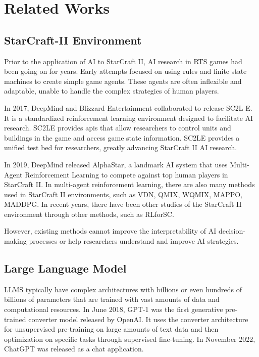 \section{Related Works}
\subsection{StarCraft-II Environment}
Prior to the application of AI to StarCraft II, AI research in RTS games had been going on for years. Early attempts focused on using rules and finite state machines to create simple game agents. These agents are often inflexible and adaptable, unable to handle the complex strategies of human players. 

In 2017, DeepMind and Blizzard Entertainment collaborated to release SC2L
E\cite{SC2LE}. It is a standardized reinforcement learning environment designed to facilitate AI research. SC2LE provides apis that allow researchers to control units and buildings in the game and access game state information. SC2LE provides a unified test bed for researchers, greatly advancing StarCraft II AI research. 

In 2019, DeepMind released AlphaStar, a landmark AI system that uses Multi-Agent Reinforcement Learning to compete against top human players in StarCraft II. In multi-agent reinforcement learning, there are also many methods used in StarCraft II environments, such as VDN\cite{VDN}, QMIX\cite{QMIX}, WQMIX\cite{WQMIX}, MAPPO\cite{MAPPO}, MADDPG\cite{MADDPG}. In recent years, there have been other studies of the StarCraft II environment through other methods, such as RLforSC\cite{RLforSC}.

However, existing methods cannot improve the interpretability of AI decision-making processes or help researchers understand and improve AI strategies.


\subsection{Large Language Model}
LLMS typically have complex architectures with billions or even hundreds of billions of parameters that are trained with vast amounts of data and computational resources. In June 2018, GPT-1 was the first generative pre-trained converter model released by OpenAI. It uses the converter architecture for unsupervised pre-training on large amounts of text data and then optimization on specific tasks through supervised fine-tuning. In November 2022, ChatGPT was released as a chat application. 

